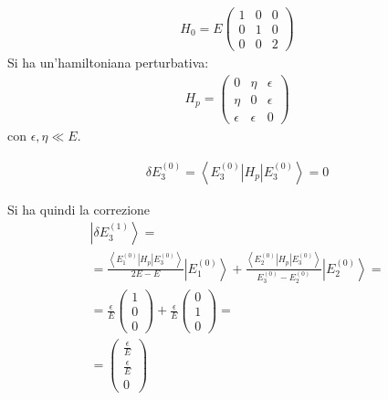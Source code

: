 \begin{equation}\begin{split}
H_0=E\left(\begin{matrix}
1&0&0\\
0&1&0\\
0&0&2
\end{matrix}\right)
\end{split}\end{equation}
Si ha un'hamiltoniana perturbativa:
\begin{equation}\begin{split}
H_p=\left(\begin{matrix}
0&\eta &\epsilon\\
\eta &0&\epsilon\\
\epsilon &\epsilon &0
\end{matrix}\right)
\end{split}\end{equation}
con $\epsilon, \eta\ll E$.

\begin{equation}\begin{split}
\delta E_3^{\left(0\right)}=\left\langle E_3^{\left(0\right)}|H_p|E_3^{\left(0\right)} \right\rangle=0
\end{split}\end{equation}

Si ha quindi la correzione
\begin{equation}\begin{split}
\left |\delta E_3^{\left(1\right)} \right\rangle=\\
=\frac{\left\langle E_1^{\left(0\right)}|H_p|E_3^{\left(0\right)} \right\rangle}{2E-E}\left |E_1^{\left(0\right)} \right\rangle+\frac{\left\langle E_2^{\left(0\right)}|H_p|E_3^{\left(0\right)} \right\rangle}{E_3^{\left(0\right)}-E_2^{\left(0\right)}}\left |E_2^{\left(0\right)} \right\rangle=\\
=\frac{\epsilon}{E}\left(\begin{matrix}1\\0\\0\end{matrix}\right)+\frac{\epsilon}{E}\left(\begin{matrix}0\\1\\0\end{matrix}\right)=\\
=\left(\begin{matrix}
\frac{\epsilon}{E}\\
\frac{\epsilon}{E}\\
0
\end{matrix}\right)
\end{split}\end{equation}

